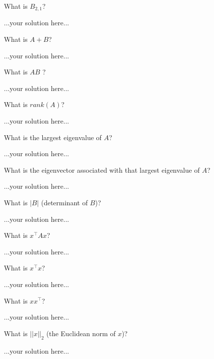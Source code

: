 \documentclass[]{../util/ColumbiaAssm}
\begin{document}
\begin{questions} %

\question[2] What is $B_{2,1}$? %
\begin{solution}
...your solution here...
\end{solution}

\question[2] What is $A + B$?
\begin{solution}
...your solution here...
\end{solution}

\question[2] What is $ AB $ ?
\begin{solution}
...your solution here...
\end{solution}

\question[2] What is $rank(A)$?
\begin{solution}
...your solution here...
\end{solution}

\question[2] What is the largest eigenvalue of $A$?
\begin{solution}
...your solution here...
\end{solution}

\question[2] What is the eigenvector associated with that largest eigenvalue of $A$?
\begin{solution}
...your solution here...
\end{solution}

\question[2] What is $|B|$ (determinant of $B$)?
\begin{solution}
...your solution here...
\end{solution}

\question[2] What is $x^\top A x$?
\begin{solution}
...your solution here...
\end{solution}

\question[2] What is $x^\top x$?
\begin{solution}
...your solution here...
\end{solution}

\question[2] What is $xx^\top $?
\begin{solution}
...your solution here...
\end{solution}

\question[2] What is $||x||_2$ (the Euclidean norm of $x$)?
\begin{solution}
...your solution here...
\end{solution}


\end{questions}
\end{document}
